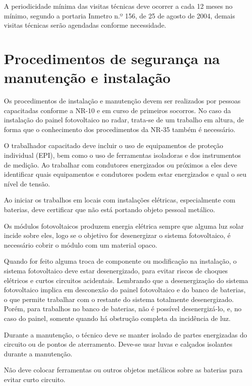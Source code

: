 A periodicidade mínima das visitas técnicas deve ocorrer a cada 12 meses no mínimo, segundo a portaria Inmetro n.º 156, de 25 de agosto de 2004, demais visitas técnicas serão agendadas conforme necessidade.

\section{Procedimentos de segurança na manutenção e instalação }

Os procedimentos de instalação e manutenção devem ser realizados por pessoas capacitadas conforme a NR-10 e em curso de primeiros socorros. No caso da instalação do painel fotovoltaico no radar, trata-se de um trabalho em altura, de forma que o conhecimento dos procedimentos da NR-35 também é necessário.

O trabalhador capacitado deve incluir o uso de equipamentos de proteção individual (EPI), bem como o uso de ferramentas isoladoras e dos instrumentos de medição. Ao trabalhar com condutores energizados ou próximos a eles deve identificar quais equipamentos e condutores podem estar energizados e qual o seu nível de tensão.

Ao iniciar os trabalhos em locais com instalações elétricas, especialmente com baterias, deve certificar que não está portando objeto pessoal metálico.

Os módulos fotovoltaicos produzem energia elétrica sempre que alguma luz solar incide sobre eles, logo se o objetivo for desenergizar o sistema fotovoltaico, é necessário cobrir o módulo com um material opaco.

Quando for feito alguma troca de componente ou modificação na instalação, o sistema fotovoltaico deve estar desenergizado, para evitar riscos de choques elétricos e curtos circuitos acidentais. Lembrando que a desenergização do sistema fotovoltaico implica em desconexão do painel fotovoltaico e do banco de baterias, o que permite trabalhar com o restante do sistema totalmente desenergizado. Porém, para trabalhos no banco de baterias, não é possível desenergizá-lo, e, no caso do painel, somente quando há obstrução completa da incidência de luz.

Durante a manutenção, o técnico deve se manter isolado de partes energizadas do circuito ou de pontos de aterramento. Deve-se usar luvas e calçados isolantes durante a manutenção.

Não deve colocar ferramentas ou outros objetos metálicos sobre as baterias para evitar curto circuito.

